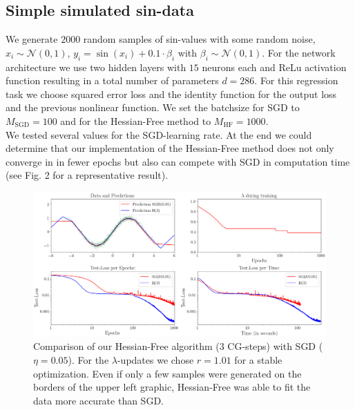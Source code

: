 \documentclass[conference]{IEEEtran}
\begin{document}
	\subsection{Simple simulated sin-data}
	\noindent
	We generate $2000$ random samples of sin-values with some random noise, $x_{i}\sim\mathcal{N}(0, 1)$, $y_{i}=\sin(x_{i})+0.1\cdot\beta_{i}$ with  $\beta_{i}\sim\mathcal{N}(0,1)$. For the network architecture we use two hidden layers with $15$ neurons each and ReLu activation function resulting in a total number of parameters $d=286$. For this regression task we choose squared error loss and the identity function for the output loss and the previous nonlinear function. We set the batchsize for SGD to $M_{\mathrm{SGD}}=100$ and for the Hessian-Free method to $M_{\mathrm{HF}}=1000$.\\
	We tested several values for the SGD-learning rate. At the end we could determine that our implementation of the Hessian-Free method does not only converge in in fewer epochs but also can compete with SGD in computation time (see Fig. 2 for a representative result).


	\begin{figure}[tb]
		\centering
		\includegraphics[width=\textwidth]{toy_005.png}
		\caption{Comparison of our Hessian-Free algorithm (3 CG-steps) with SGD ($\eta=0.05$). For the $\lambda$-updates we chose $r=1.01$ for a stable optimization. Even if only a few samples were generated on the borders of the upper left graphic, Hessian-Free was able to fit the data more accurate than SGD.}
		\label{fig2}
	\end{figure}
\end{document}

